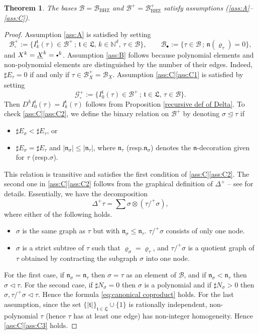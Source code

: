\documentclass[11pt]{article}
\newcommand{\resp}{resp.\xspace}
\numberwithin{equation}{section}
\newcommand{\sbullet}{{\scriptscriptstyle\bullet}}
\newcommand{\scbullet}{{\raisebox{1pt}{$\sbullet$}}}
\theoremstyle{plain}
\newtheorem{thm}{Theorem}
\theoremstyle{definition}
\newcommand{\BHZ}{{\scriptscriptstyle\mathrm{BHZ}}}
\newcommand{\bsmcB}{\boldsymbol{\mathcal{B}}}
\newcommand{\frkL}{\mathfrak{L}}
\newcommand{\frkt}{\mathfrak{t}}
\newcommand{\frkn}{\mathfrak{n}}
\let\pord\trianglelefteq
\let\spord\triangleleft
\newcommand{\bbN}{\mathbb{N}}
\newcommand{\mcB}{\mathcal{B}}
\newcommand{\mcG}{\mathcal{G}}
\begin{document}
\begin{thm}\label{BHZ-ABC}
The bases $\mcB=\mcB_{\BHZ}$ and $\mcB^+=\mcB_{\BHZ}^+$ satisfy assumptions \textup{(\ref{ass:A}--\ref{ass:C})}.
\end{thm}

\begin{proof}
Assumption \eqref{ass:A} is satisfied by setting
\[
\mcB_\circ^+:=\{I_k^{\frkt}(\tau)\in\mcB^+\,;\, \frkt\in\frkL,\, k\in\bbN^d,\, \tau\in\mcB\},\qquad
\mcB_\sbullet:=\{\tau\in\mcB\,;\, \frkn(\varrho_\tau)=0\},
\]
and $X^k=\underline{X}^k=\scbullet^k$.
Assumption \eqref{ass:B} follows because polynomial elements and non-polynomial elements are distinguished by the number of their edges. Indeed, $\sharp E_\tau=0$ if and only if $\tau\in\mcB_X^+=\mcB_{\underline{X}}$.
Assumption \ref{ass:C}\eqref{ass:C1} is satisfied by setting
\[
\mcG_\circ^+:=\{I_0^{\frkt}(\tau)\in\mcB^+\,;\, \frkt\in\frkL,\, \tau\in\mcB\}.
\]
Then $D^kI_0^{\frkt}(\tau)=I_k^{\frkt}(\tau)$ follows from Proposition \ref{recursive def of Delta}.
To check \ref{ass:C}\eqref{ass:C2}, we define the binary relation on $\mcB^+$ by denoting $\sigma\pord\tau$ if
\begin{itemize}
\item $\sharp E_\sigma<\sharp E_\tau$, or
\item $\sharp E_\sigma=\sharp E_\tau$ and $|\frkn_\sigma|\le|\frkn_\tau|$, where $\frkn_\tau$ (\resp $\frkn_\sigma$) denotes the $\frkn$-decoration given for $\tau$ (\resp $\sigma$).
\end{itemize}
This relation is transitive and satisfies the first condition of \ref{ass:C}\eqref{ass:C2}.
The second one in \ref{ass:C}\eqref{ass:C2} follows from the graphical definition of $\Delta^+$ -- see \cite[\S2]{BHZ} for details. Essentially, we have the decomposition
\[
\Delta^+\tau=\sum\sigma\otimes(\tau/^+\sigma),
\]
where either of the following holds.
\begin{itemize}
\item $\sigma$ is the same graph as $\tau$ but with $\frkn_\sigma\le\frkn_\tau$.
$\tau/^+\sigma$ consists of only one node.
\item $\sigma$ is a strict subtree of $\tau$ such that $\varrho_\sigma=\varrho_\tau$, and $\tau/^+\sigma$ is a quotient graph of $\tau$ obtained by contracting the subgraph $\sigma$ into one node.
\end{itemize}
For the first case, if $\frkn_\sigma=\frkn_\tau$ then $\sigma=\tau$ as an element of $\bsmcB$, and if $\frkn_\sigma<\frkn_\tau$ then $\sigma\spord\tau$.
For the second case, if $\sharp N_\sigma=0$ then $\sigma$ is a polynomial and if $\sharp N_\sigma>0$ then $\sigma,\tau/^+\sigma\spord\tau$.
Hence the formula \eqref{eq:canonical coproduct} holds.
For the last assumption, since the set $\{|\mathfrak{t}|\}_{\mathfrak{t}\in\mathfrak{L}}\cup\{1\}$ is rationally independent, non-polynomial $\tau$ (hence $\tau$ has at least one edge) has non-integer homogeneity. Hence \ref{ass:C}\eqref{ass:C3} holds.
\end{proof}
\end{document}

